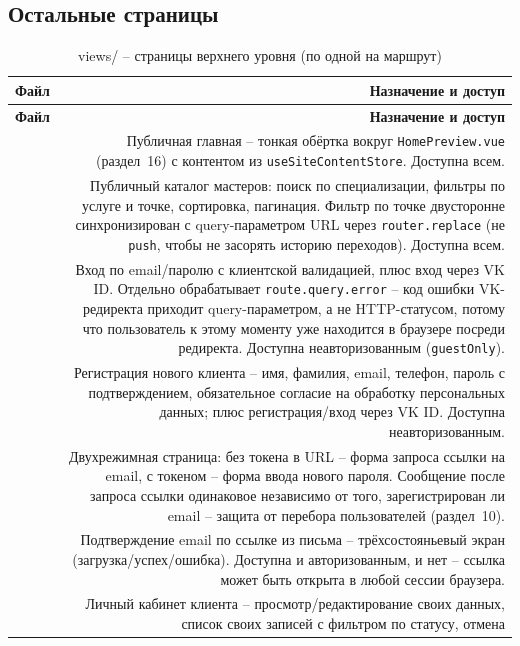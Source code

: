 \subsection{Остальные страницы}

\begin{xltabular}{\textwidth}{M D}
\caption{views/ -- страницы верхнего уровня (по одной на маршрут)} \\
\hline
\textbf{Файл} & \textbf{Назначение и доступ} \\
\hline
\endfirsthead
\hline
\textbf{Файл} & \textbf{Назначение и доступ} \\
\hline
\endhead
\hline
\endfoot
{} & Публичная главная -- тонкая обёртка вокруг
  \texttt{HomePreview.vue} (раздел~16) с контентом из
  \texttt{useSiteContentStore}. Доступна всем. \\
 & Публичный каталог мастеров: поиск по
  специализации, фильтры по услуге и точке, сортировка, пагинация.
  Фильтр по точке двусторонне синхронизирован с query-параметром URL
  через \texttt{router.replace} (не \texttt{push}, чтобы не засорять
  историю переходов). Доступна всем. \\
 & Вход по email/паролю с клиентской валидацией,
  плюс вход через VK ID. Отдельно обрабатывает
  \texttt{route.query.error} -- код ошибки VK-редиректа приходит
  query-параметром, а не HTTP-статусом, потому что пользователь к этому
  моменту уже находится в браузере посреди редиректа. Доступна
  неавторизованным (\texttt{guestOnly}). \\
 & Регистрация нового клиента -- имя, фамилия,
  email, телефон, пароль с подтверждением, обязательное согласие на
  обработку персональных данных; плюс регистрация/вход через VK ID.
  Доступна неавторизованным. \\
 & Двухрежимная страница: без токена в URL
  -- форма запроса ссылки на email, с токеном -- форма ввода нового
  пароля. Сообщение после запроса ссылки одинаковое независимо от того,
  зарегистрирован ли email -- защита от перебора пользователей (раздел~10). \\
 & Подтверждение email по ссылке из письма
  -- трёхсостояньевый экран (загрузка/успех/ошибка). Доступна и
  авторизованным, и нет -- ссылка может быть открыта в любой сессии
  браузера. \\
 & Личный кабинет клиента -- просмотр/редактирование
  своих данных, список своих записей с фильтром по статусу, отмена

\end{xltabular}
